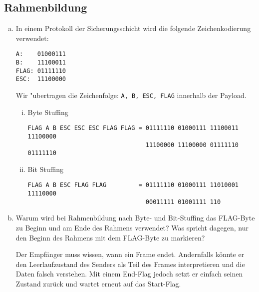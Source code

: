 \setcounter{section}{3}
\setcounter{subsection}{0}
\subsection{Rahmenbildung}

\begin{enumerate}[(a)]
    \item In einem Protokoll der Sicherungsschicht wird die folgende Zeichenkodierung
        verwendet:

        \verb|A:    01000111|\\
        \verb|B:    11100011|\\
        \verb|FLAG: 01111110|\\
        \verb|ESC:  11100000|

        Wir "ubertragen die Zeichenfolge: \verb|A, B, ESC, FLAG| innerhalb der Payload.

        \begin{enumerate}[i.]
            \item Byte Stuffing

\begin{verbatim}
FLAG A B ESC ESC ESC FLAG FLAG = 01111110 01000111 11100011 11100000
                                 11100000 11100000 01111110 01111110
\end{verbatim}

            \item Bit Stuffing

\begin{verbatim}
FLAG A B ESC FLAG FLAG         = 01111110 01000111 11010001 11110000
                                 00011111 01001111 110
\end{verbatim}
        \end{enumerate}

    \item Warum wird bei Rahmenbildung nach Byte- und Bit-Stuffing das FLAG-Byte
        zu Beginn und am Ende des Rahmens verwendet? Was spricht dagegen, nur
        den Beginn des Rahmens mit dem FLAG-Byte zu markieren?

        Der Empfänger muss wissen, wann ein Frame endet. Andernfalls könnte er
        den Leerlaufzustand des Senders als Teil des Frames interpretieren und
        die Daten falsch verstehen. Mit einem End-Flag jedoch setzt er einfach
        seinen Zustand zurück und wartet erneut auf das Start-Flag.
\end{enumerate}
